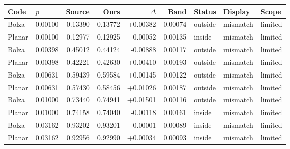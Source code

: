 \small\begin{longtable}{llrrrrlll}
\toprule Code & $p$ & Source & Ours & $\Delta$ & Band & Status & Display & Scope\\\midrule\endhead
Bolza & 0.00100 & 0.13390 & 0.13772 & +0.00382 & 0.00074 & outside & mismatch & limited\\
Planar & 0.00100 & 0.12977 & 0.12925 & -0.00052 & 0.00135 & inside & mismatch & limited\\
Bolza & 0.00398 & 0.45012 & 0.44124 & -0.00888 & 0.00117 & outside & mismatch & limited\\
Planar & 0.00398 & 0.42221 & 0.42630 & +0.00410 & 0.00193 & outside & mismatch & limited\\
Bolza & 0.00631 & 0.59439 & 0.59584 & +0.00145 & 0.00122 & outside & mismatch & limited\\
Planar & 0.00631 & 0.57430 & 0.58456 & +0.01026 & 0.00187 & outside & mismatch & limited\\
Bolza & 0.01000 & 0.73440 & 0.74941 & +0.01501 & 0.00116 & outside & mismatch & limited\\
Planar & 0.01000 & 0.74158 & 0.74040 & -0.00118 & 0.00161 & inside & mismatch & limited\\
Bolza & 0.03162 & 0.93202 & 0.93201 & -0.00001 & 0.00089 & inside & mismatch & limited\\
Planar & 0.03162 & 0.92956 & 0.92990 & +0.00034 & 0.00093 & inside & mismatch & limited\\
\bottomrule\end{longtable}\normalsize
